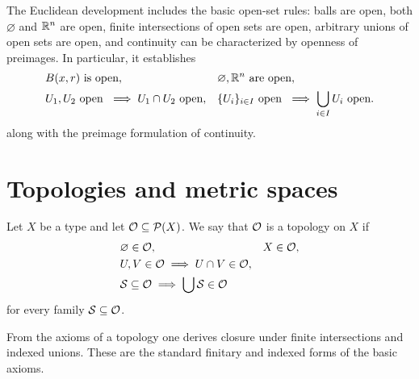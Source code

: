 \begin{proposition}\label{prop:euclidean-open-calculus-0-7-0-9}
\leanok
The Euclidean development includes the basic open-set rules: balls are open, both $\varnothing$ and $\mathbb{R}^n$ are open, finite intersections of open sets are open, arbitrary unions of open sets are open, and continuity can be characterized by openness of preimages.
In particular, it establishes
\[
\begin{aligned}
&B(x,r) \text{ is open},
&&\varnothing,\mathbb{R}^n \text{ are open},\\
&U_1,U_2 \text{ open } \implies U_1\cap U_2 \text{ open},
&&\{U_i\}_{i\in I} \text{ open } \implies \bigcup_{i\in I}U_i \text{ open}.
\end{aligned}
\]
along with the preimage formulation of continuity.
\end{proposition}

\section{Topologies and metric spaces}

\begin{definition}\label{def:topology-open}
\leanok
Let $X$ be a type and let $\mathcal{O} \subseteq \mathcal{P}(X)$. We say that $\mathcal{O}$ is a topology on $X$ if
\[
\begin{aligned}
&\varnothing \in \mathcal{O},
&&X \in \mathcal{O},\\
&U,V \in \mathcal{O} \implies U\cap V \in \mathcal{O},\\
&\mathcal S\subseteq\mathcal{O} \implies \bigcup \mathcal S \in \mathcal{O}
\end{aligned}
\]
for every family $\mathcal S \subseteq \mathcal{O}$.
\end{definition}

\begin{proposition}\label{prop:topology-helpers-1-1}
\leanok
From the axioms of a topology one derives closure under finite intersections and indexed unions.
These are the standard finitary and indexed forms of the basic axioms.
\end{proposition}


